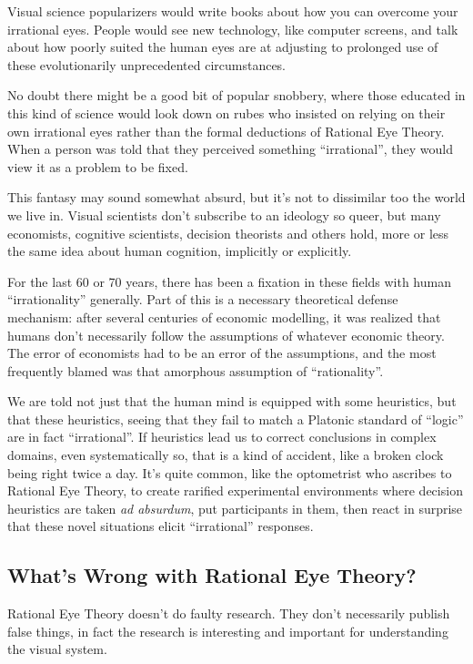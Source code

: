\documentclass{article}
\begin{document}
Visual science popularizers would write books about how you can overcome your irrational eyes.
People would see new technology, like computer screens, and talk about how poorly suited the human eyes are at adjusting to prolonged use of these evolutionarily unprecedented circumstances.

No doubt there might be a good bit of popular snobbery, where those educated in this kind of science would look down on rubes who insisted on relying on their own irrational eyes rather than the formal deductions of Rational Eye Theory.
When a person was told that they perceived something ``irrational'', they would view it as a problem to be fixed.

This fantasy may sound somewhat absurd, but it's not to dissimilar too the world we live in.
Visual scientists don't subscribe to an ideology so queer, but many economists, cognitive scientists, decision theorists and others hold, more or less the same idea about human cognition, implicitly or explicitly.

For the last 60 or 70 years, there has been a fixation in these fields with human ``irrationality'' generally.
Part of this is a necessary theoretical defense mechanism: after several centuries of economic modelling, it was realized that humans don't necessarily follow the assumptions of whatever economic theory.
The error of economists had to be an error of the assumptions, and the most frequently blamed was that amorphous assumption of ``rationality''.

We are told not just that the human mind is equipped with some heuristics, but that these heuristics, seeing that they fail to match a Platonic standard of ``logic'' are in fact ``irrational''.
If heuristics lead us to correct conclusions in complex domains, even systematically so, that is a kind of accident, like a broken clock being right twice a day.
It's quite common, like the optometrist who ascribes to Rational Eye Theory, to create rarified experimental environments where decision heuristics are taken \textit{ad absurdum}, put participants in them, then react in surprise that these novel situations elicit ``irrational'' responses.

\subsection{What's Wrong with Rational Eye Theory?}

Rational Eye Theory doesn't do faulty research.
They don't necessarily publish false things, in fact the research is interesting and important for understanding the visual system.
\end{document}

